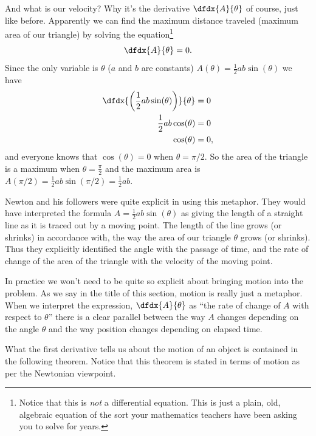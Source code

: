 And what is our velocity? Why it's the derivative $\dfdx{A}{\theta}$
of course, just like before. Apparently we can find the maximum
distance traveled (maximum area of our triangle) by solving the
equation\footnote{Notice that this is \emph{not} a differential
  equation. This is just a plain, old, algebraic equation of the sort
  your mathematics teachers have been asking you to solve for years. }
$$
\dfdx{A}{\theta} = 0.
$$
Since the only variable is $\theta$ ($a$ and $b$ are constants) $A(\theta)=\frac12ab\sin(\theta)$ we have
\begin{align*}
  \dfdx{
  \left(
  \frac12ab\sin(\theta)
  \right)}{\theta} &= 0 \\
  \frac12ab\cos(\theta) &= 0 \\
  \cos(\theta) &= 0, \\
\end{align*}
and everyone knows that $\cos(\theta)=0$ when $\theta=\pi/2.$ So the
area of the triangle is a maximum when $\theta=\frac{\pi}{2}$ and the
maximum area is $A(\pi/2)=\frac12ab\sin(\pi/2)=\frac12ab.$

Newton and his followers were quite explicit in using this
metaphor. They would have interpreted the formula
$A=\frac12ab\sin(\theta)$ as giving the length of a straight line as
it is traced out by a moving point. The length of the line grows (or
shrinks) in accordance with, the way the area of our triangle $\theta$
grows (or shrinks). Thus they explicitly identified the angle with the
passage of time, and the rate of change of the area of the triangle
with the velocity of the moving point.

In practice we won't need to be quite so explicit about bringing
motion into the problem.  As we say in the title of this section,
motion is really just a metaphor. When we interpret the expression,
$\dfdx{A}{\theta}$ as ``the rate of change of $A$ with respect to
$\theta$'' there is a clear parallel between the way $A$ changes
depending on the angle $\theta$ and the way position changes depending
on elapsed time.


What the first derivative tells us about the motion of an object is
contained in the following theorem. Notice that this theorem is stated
in terms of motion as per the Newtonian viewpoint.

